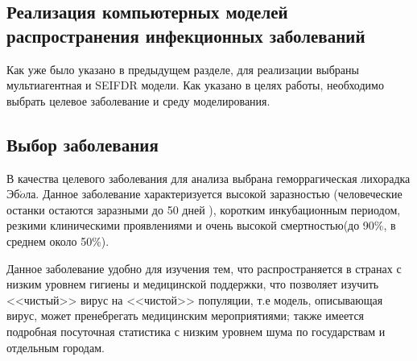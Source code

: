 \newpage
\parindent=1cm %
\begin{center}
		
		\section{Реализация компьютерных моделей распространения инфекционных заболеваний}
		
\end{center}


Как уже было указано  в предыдущем разделе, для реализации выбраны мультиагентная и SEIFDR модели. Как указано в целях работы, необходимо выбрать целевое заболевание и среду моделирования.

\subsection{Выбор заболевания}

В качества целевого заболевания для анализа выбрана геморрагическая лихорадка Эб$\acute{o}$ла. Данное заболевание характеризуется высокой заразностью (человеческие останки остаются заразными до 50 дней %
), коротким инкубационным периодом, резкими клиническими проявлениями и очень высокой смертностью(до 90\%, в среднем около 50\%). %

Данное заболевание удобно для изучения тем, что распространяется в странах с низким уровнем гигиены и медицинской поддержки, что позволяет изучить <<чистый>> вирус на <<чистой>> популяции, т.е модель, описывающая вирус, может пренебрегать медицинским мероприятиями; также имеется подробная посуточная статистика с низким уровнем шума по государствам и отдельным городам.